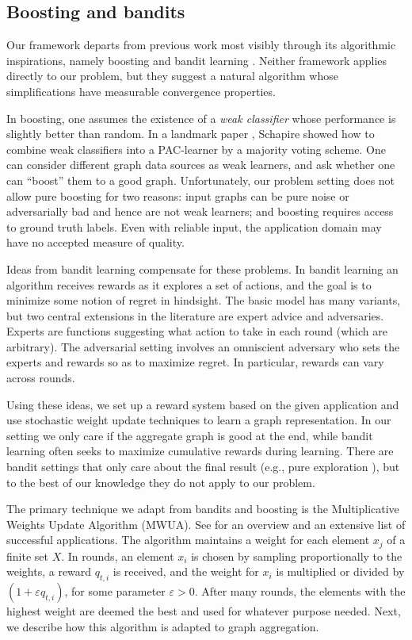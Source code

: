 \documentclass{IEEEtran}
\begin{document}
\subsection{Boosting and bandits}
Our framework departs from previous work most visibly through its algorithmic
inspirations, namely boosting \cite{Schapire90} and bandit learning
\cite{Bubeck12}. Neither framework applies directly to our problem, but they
suggest a natural algorithm whose simplifications have measurable convergence
properties. 

In boosting, one assumes the existence of a {\em weak classifier} whose
performance is slightly better than random. In a landmark paper
\cite{Schapire90}, Schapire showed how to combine weak classifiers into a
PAC-learner by a majority voting scheme. One can consider different graph data
sources as weak learners, and ask whether one can ``boost'' them to a good
graph. Unfortunately, our problem setting does not allow pure boosting for two
reasons: input graphs can be pure noise or adversarially bad and hence are not
weak learners; and boosting requires access to ground truth labels. Even with
reliable input, the application domain may have no accepted measure of quality. 

Ideas from bandit learning compensate for these problems. In bandit learning an
algorithm receives rewards as it explores a set of actions, and the goal is to
minimize some notion of regret in hindsight. The basic model has many variants,
but two central extensions in the literature are expert advice and adversaries.
Experts are functions suggesting what action to take in each round (which are
arbitrary). The adversarial setting involves an omniscient adversary who sets
the experts and rewards so as to maximize regret. In particular, rewards can
vary across rounds.

Using these ideas, we set up a reward system based on the given application and
use stochastic weight update techniques to learn a graph representation. In our
setting we only care if the aggregate graph is good at the end, while bandit
learning often seeks to maximize cumulative rewards during learning. There are
bandit settings that only care about the final result (e.g., pure exploration
\cite{Bubeck09}), but to the best of our knowledge they do not apply to our
problem. 

The primary technique we adapt from bandits and boosting is the
Multiplicative Weights Update Algorithm (MWUA). See \cite{Arora12} for an
overview and an extensive list of successful applications. The algorithm
maintains a weight for each element $x_j$ of a finite set $X$. In rounds,  
an element $x_i$ is chosen by sampling proportionally to the weights, a reward
$q_{t,i}$ is received, and the weight for $x_i$ is multiplied or divided by $(1
+ \varepsilon q_{t,i})$, for some parameter $\varepsilon >0$. After many
rounds, the elements with the highest weight are deemed the best and used for
whatever purpose needed. Next, we describe how this algorithm is adapted to
graph aggregation. 
\end{document}
